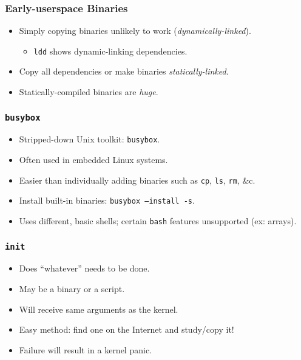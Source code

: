 \documentclass[xcolor={dvipsnames,svgnames},hyperref=dvips]{beamer}
\begin{document}
	\begin{frame}
		\frametitle{Early-userspace Binaries}
		\begin{itemize}
		\item Simply copying binaries unlikely to work (\textit{dynamically-linked}).
			\begin{itemize}
			\item \texttt{ldd} shows dynamic-linking dependencies.
			\end{itemize}
		\item Copy all dependencies or make binaries \textit{statically-linked}.
		\item Statically-compiled binaries are \textit{huge}.
		\end{itemize}
	\end{frame}

	\begin{frame}
		\frametitle{\texttt{busybox}}
		\begin{itemize}
		\item Stripped-down Unix toolkit: \texttt{busybox}.
		\item Often used in embedded Linux systems.
		\item Easier than individually adding binaries such as \texttt{cp}, \texttt{ls}, \texttt{rm}, \&c.
		\item Install built-in binaries: \texttt{busybox --install -s}.
		\item Uses different, basic shells; certain \texttt{bash} features unsupported (ex: arrays).
		\end{itemize}
	\end{frame}

	\begin{frame}
		\frametitle{\texttt{init}}
		\begin{itemize}
		\item Does ``whatever'' needs to be done.
		\item May be a binary or a script.
		\item Will receive same arguments as the kernel.
		\item Easy method: find one on the Internet and study/copy it!
		\item Failure will result in a kernel panic.
		\end{itemize}
	\end{frame}
\end{document}
